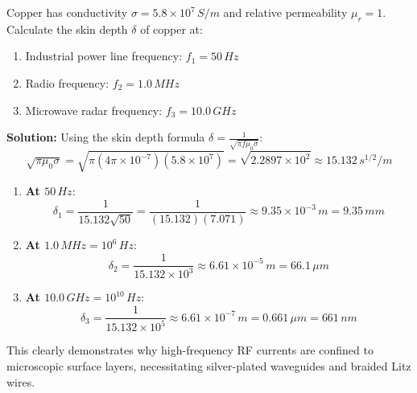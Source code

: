 \begin{example}
Copper has conductivity $\sigma = 5.8 \times 10^7\,\si{S/m}$ and relative permeability $\mu_r = 1$. Calculate the skin depth $\delta$ of copper at:
\begin{enumerate}
    \item Industrial power line frequency: $f_1 = 50\,\si{Hz}$
    \item Radio frequency: $f_2 = 1.0\,\si{MHz}$
    \item Microwave radar frequency: $f_3 = 10.0\,\si{GHz}$
\end{enumerate}

\textbf{Solution:}
Using the skin depth formula $\delta = \frac{1}{\sqrt{\pi f \mu_0 \sigma}}$:
\begin{equation*}
    \sqrt{\pi \mu_0 \sigma} = \sqrt{\pi (4\pi \times 10^{-7})(5.8 \times 10^7)} = \sqrt{2.2897 \times 10^2} \approx 15.132\,\si{s^{1/2}/m}
\end{equation*}
\begin{enumerate}
    \item \textbf{At $50\,\si{Hz}$}:
    \begin{equation*}
        \delta_1 = \frac{1}{15.132 \sqrt{50}} = \frac{1}{(15.132)(7.071)} \approx 9.35 \times 10^{-3}\,\si{m} = 9.35\,\si{mm}
    \end{equation*}
    \item \textbf{At $1.0\,\si{MHz} = 10^6\,\si{Hz}$}:
    \begin{equation*}
        \delta_2 = \frac{1}{15.132 \times 10^3} \approx 6.61 \times 10^{-5}\,\si{m} = 66.1\,\si{\mu m}
    \end{equation*}
    \item \textbf{At $10.0\,\si{GHz} = 10^{10}\,\si{Hz}$}:
    \begin{equation*}
        \delta_3 = \frac{1}{15.132 \times 10^5} \approx 6.61 \times 10^{-7}\,\si{m} = 0.661\,\si{\mu m} = 661\,\si{nm}
    \end{equation*}
\end{enumerate}
This clearly demonstrates why high-frequency RF currents are confined to microscopic surface layers, necessitating silver-plated waveguides and braided Litz wires.
\end{example}

